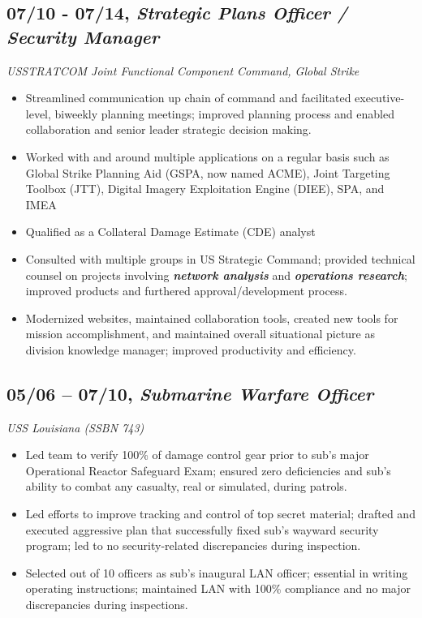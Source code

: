 \documentclass[10pt]{article}
\def\tightlist{}
\begin{document}
\hypertarget{strategic-plans-officer-security-manager}{%
\subsection{\texorpdfstring{07/10 - 07/14, \textbf{\emph{Strategic Plans
Officer / Security
Manager}}}{07/10 - 07/14, Strategic Plans Officer / Security Manager}}\label{strategic-plans-officer-security-manager}}

\emph{USSTRATCOM Joint Functional Component Command, Global Strike}

\begin{itemize}
\tightlist
\item
  Streamlined communication up chain of command and facilitated
  executive-level, biweekly planning meetings; improved planning process
  and enabled collaboration and senior leader strategic decision making.
\item
  Worked with and around multiple applications on a regular basis such
  as Global Strike Planning Aid (GSPA, now named ACME), Joint Targeting
  Toolbox (JTT), Digital Imagery Exploitation Engine (DIEE), SPA, and
  IMEA
\item
  Qualified as a Collateral Damage Estimate (CDE) analyst
\item
  Consulted with multiple groups in US Strategic Command; provided
  technical counsel on projects involving \textbf{\emph{network
  analysis}} and \textbf{\emph{operations research}}; improved products
  and furthered approval/development process.
\item
  Modernized websites, maintained collaboration tools, created new tools
  for mission accomplishment, and maintained overall situational picture
  as division knowledge manager; improved productivity and efficiency.
\end{itemize}

\hypertarget{submarine-warfare-officer}{%
\subsection{\texorpdfstring{05/06 -- 07/10, \textbf{\emph{Submarine
Warfare
Officer}}}{05/06 -- 07/10, Submarine Warfare Officer}}\label{submarine-warfare-officer}}

\emph{USS Louisiana (SSBN 743)}

\begin{itemize}
\tightlist
\item
  Led team to verify 100\% of damage control gear prior to sub's major
  Operational Reactor Safeguard Exam; ensured zero deficiencies and
  sub's ability to combat any casualty, real or simulated, during
  patrols.
\item
  Led efforts to improve tracking and control of top secret material;
  drafted and executed aggressive plan that successfully fixed sub's
  wayward security program; led to no security-related discrepancies
  during inspection.
\item
  Selected out of 10 officers as sub's inaugural LAN officer; essential
  in writing operating instructions; maintained LAN with 100\%
  compliance and no major discrepancies during inspections.
\end{itemize}
\end{document}
